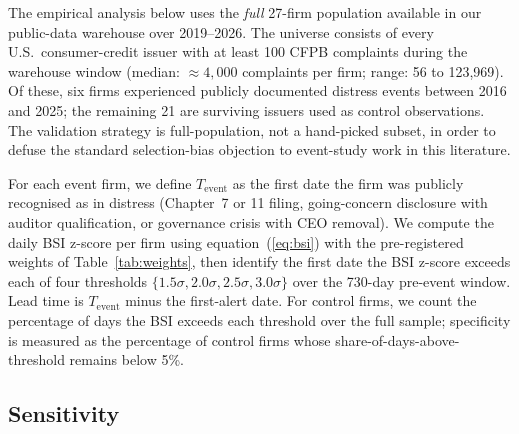 \documentclass[11pt,a4paper]{article}
\begin{document}
The empirical analysis below uses the \emph{full} 27-firm population available in our public-data warehouse over 2019--2026. The universe consists of every U.S.\ consumer-credit issuer with at least 100 CFPB complaints during the warehouse window (median: $\approx 4{,}000$ complaints per firm; range: 56 to 123{,}969). Of these, six firms experienced publicly documented distress events between 2016 and 2025; the remaining 21 are surviving issuers used as control observations. The validation strategy is full-population, not a hand-picked subset, in order to defuse the standard selection-bias objection to event-study work in this literature.

For each event firm, we define $T_{\text{event}}$ as the first date the firm was publicly recognised as in distress (Chapter~7 or 11 filing, going-concern disclosure with auditor qualification, or governance crisis with CEO removal). We compute the daily BSI z-score per firm using equation~(\ref{eq:bsi}) with the pre-registered weights of Table~\ref{tab:weights}, then identify the first date the BSI z-score exceeds each of four thresholds $\{1.5\sigma, 2.0\sigma, 2.5\sigma, 3.0\sigma\}$ over the 730-day pre-event window. Lead time is $T_{\text{event}}$ minus the first-alert date. For control firms, we count the percentage of days the BSI exceeds each threshold over the full sample; specificity is measured as the percentage of control firms whose share-of-days-above-threshold remains below 5\%.

\subsection{Sensitivity}\label{sec:results_sens}
\end{document}

